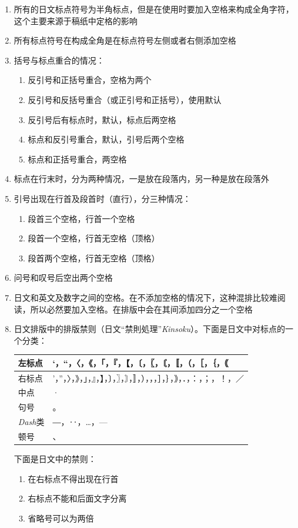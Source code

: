 \documentclass{article}
\begin{document}
\begin{enumerate}
\item 所有的日文标点符号为半角标点，但是在使用时要加入空格来构成全角字符，这个主要来源于稿纸中定格的影响
\item 所有标点符号在构成全角是在标点符号左侧或者右侧添加空格
\item 括号与标点重合的情况：
	\begin{enumerate}
	\item 反引号和正括号重合，空格为两个
	\item 反引号和反括号重合（或正引号和正括号），使用默认
	\item 反引号后有标点时，默认，标点后两空格
	\item 标点和反引号重合，默认，引号后两个空格
	\item 标点和正括号重合，两空格
	\end{enumerate}
\item 标点在行末时，分为两种情况，一是放在段落内，另一种是放在段落外
\item 引号出现在行首及段首时（直行），分三种情况：
	\begin{enumerate}
	\item 段首三个空格，行首一个空格
	\item 段首一个空格，行首无空格（顶格）
	\item 段首两个空格，行首无空格（顶格）
	\end{enumerate}
\item 问号和叹号后空出两个空格
\item 日文和英文及数字之间的空格。在不添加空格的情况下，这种混排比较难阅读，所以必然要加入空格。在排版中会在其间添加四分之一个空格
\item 日文排版中的排版禁则（日文“禁則処理”\textit{Kinsoku}）。下面是日文中对标点的一个分类：
\begin{table}[!ht]
\begin{center}
\begin{tabular}{ll}
\hline
左标点 &‘，“，〈，《，「，『，【，〔，〖，〘，〚，（，［，｛，｟\\
\hline
右标点 &’，”，〉，》，」，』，】，〕，〗，〙，〛，），，，］，｝，｠，．，：，；，！，／\\
\hline
中点&·\\
\hline
句号&。\\
\hline
\textit{Dash}类&―，‥，…，—\\
\hline
顿号&、\\
\hline
\end{tabular}
\end{center}
\end{table}
下面是日文中的禁则：
	\begin{enumerate}
	\item 在右标点不得出现在行首
	\item 右标点不能和后面文字分离
	\item 省略号可以为两倍
	\end{enumerate}
\end{enumerate}
\end{document}
